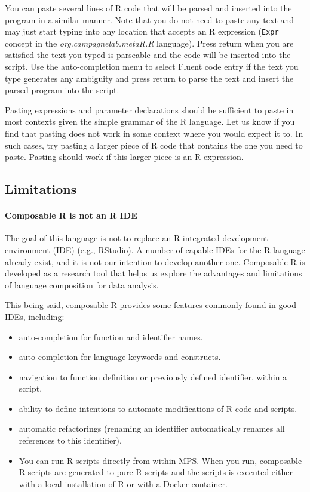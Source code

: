 You can paste several lines of R code that will be parsed and inserted into the program in a similar manner. Note that you do not need to paste any text and may just start typing into any location that accepts an R expression (\texttt{Expr} concept in the \textit{org\allowbreak{}.campagnelab\allowbreak{}.metaR\allowbreak{}.R} language). Press return when you are satisfied the text you typed is parseable and the code will be inserted into the script. Use the auto-completion menu to select Fluent code entry if the text you type generates any ambiguity and press return to parse the text and insert the parsed program into the script. 

\begin{remark}
Pasting expressions and parameter declarations should be sufficient to paste in most contexts given the simple grammar of the R language. Let us know if you find that pasting does not work in some context where you would expect it to. In such cases, try pasting a larger piece of R code that contains the one you need to paste. Pasting should work if this larger piece is an R expression. 
\end{remark}


\subsection{Limitations}

\paragraph{Composable R is not an R IDE}

The goal of this language is not to replace an R integrated development environment (IDE) (e.g., RStudio). A number of capable IDEs for the R language already exist, and it is not our intention to develop another one.  Composable R is developed as a research tool that helps us explore the advantages and limitations of language composition for data analysis.

This being said, composable R  provides some features commonly found in good IDEs, including:
\begin{itemize}
  \item auto-completion for function and identifier names.
  \item auto-completion for language keywords and constructs.
  \item navigation to function definition or previously defined identifier, within a script.
  \item ability to define intentions to automate modifications of R code and scripts.
  \item automatic refactorings (renaming an identifier automatically renames all references to this identifier).
  \item You can run R scripts directly from within MPS. When you run, composable R scripts are generated to pure R scripts and the scripts is executed either with a local installation of R or with a Docker container. 
\end{itemize}



